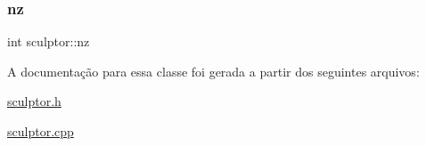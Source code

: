 \mbox{\label{classsculptor_aa9907276dba66f1f7a73b8f337c5f793}} 
\subsubsection{\texorpdfstring{nz}{nz}}
{\footnotesize\ttfamily int sculptor\+::nz\hspace{0.3cm}{\ttfamily [protected]}}



A documentação para essa classe foi gerada a partir dos seguintes arquivos\+:\begin{DoxyCompactItemize}
\item 
\mbox{\hyperlink{sculptor_8h}{sculptor.\+h}}\item 
\mbox{\hyperlink{sculptor_8cpp}{sculptor.\+cpp}}\end{DoxyCompactItemize}
